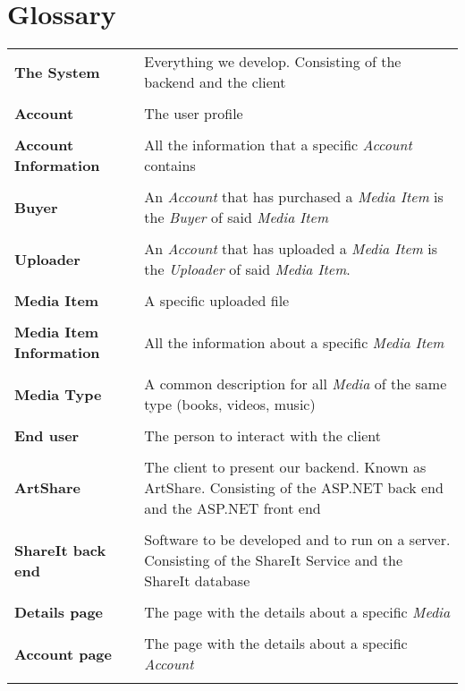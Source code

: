 \documentclass[../report.tex]{subfiles}
\begin{document}
\section{Glossary}
\begin{tabular}{l p{10 cm}}
\textbf{The System} & Everything we develop. Consisting of the backend and the client \\ \\
\textbf{Account} & The user profile \\ \\
\textbf{Account Information} & All the information  that a specific \textit{Account} contains\\ \\
\textbf{Buyer} & An \textit{Account} that has purchased a \textit{Media Item} is the \textit{Buyer} of said \textit{Media Item} \\ \\
\textbf{Uploader} & An \textit{Account} that has uploaded a \textit{Media Item} is the \textit{Uploader} of said \textit{Media Item}. \\ \\ %
\textbf{Media Item} & A specific uploaded file \\ \\
\textbf{Media Item Information} & All the information  about a specific \textit{Media Item} \\ \\
\textbf{Media Type} & A common description for all \textit{Media} of the same type (books, videos, music) \\ \\
\textbf{End user} & The person to interact with the client \\ \\
\textbf{ArtShare} & The client to present our backend. Known as ArtShare. Consisting of the ASP.NET back end and the ASP.NET front end \\ \\
\textbf{ShareIt back end} & Software to be developed and to run on a server. Consisting of the ShareIt Service and the ShareIt database \\ \\
\textbf{Details page} & The page with the details about a specific \textit{Media} \\ \\
\textbf{Account page} & The page with the details about a specific \textit{Account} \\ \\
\end{tabular}
\end{document}
